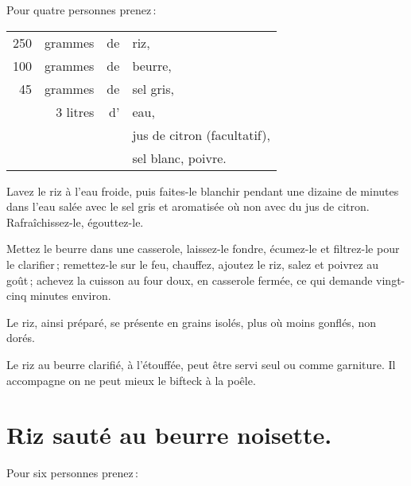Pour quatre personnes prenez :

\footnotesize
\begin{longtable}{rrrp{16em}}
    250 & grammes  & de & riz,                                                                            \\
    100 & grammes  & de & beurre,                                                                         \\
     45 & grammes  & de & sel gris,                                                                       \\
        & 3 litres & d' &  eau,                                                                           \\
        &          &    &  jus de citron (facultatif),                                                    \\
        &          &    &  sel blanc, poivre.                                                             \\
\end{longtable}
\normalsize

Lavez le riz à l'eau froide, puis faites-le blanchir pendant une dizaine de
minutes dans l'eau salée avec le sel gris et aromatisée où non avec du jus de
citron. Rafraîchissez-le, égouttez-le.

Mettez le beurre dans une casserole, laissez-le fondre, écumez-le et filtrez-le
pour le clarifier ; remettez-le sur le feu, chauffez, ajoutez le riz, salez et
poivrez au goût ; achevez la cuisson au four doux, en casserole fermée, ce qui
demande vingt-cinq minutes environ.

Le riz, ainsi préparé, se présente en grains isolés, plus où moins gonflés, non
dorés.

\medskip

Le riz au beurre clarifié, à l'étouffée, peut être servi seul ou comme
garniture. Il accompagne on ne peut mieux le bifteck à la poêle.

\section*{\centering Riz sauté au beurre noisette.}
{}
\label{pg0710} \hypertarget{p0710}{}

Pour six personnes prenez :

